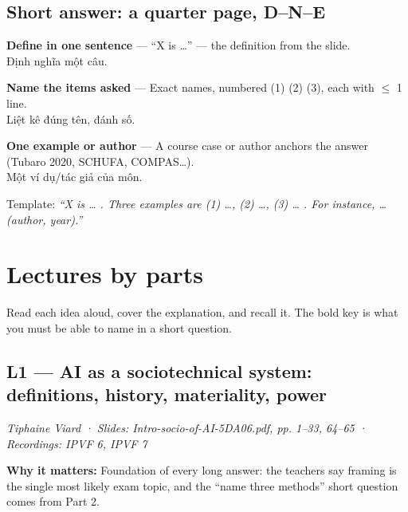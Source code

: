 \documentclass[11pt,a4paper]{article}
\newcommand{\vitext}[1]{{\small\color{tipc}#1}}
\newcommand{\blk}[1]{{\setlength{\fboxsep}{2pt}\colorbox{ink}{\sffamily\footnotesize\bfseries\color{white}\,#1\,}}}
\begin{document}
\subsection*{Short answer: a quarter page, D--N--E}\begin{description}[leftmargin=1.2cm,style=nextline]
\item[\blk{D}] \textbf{Define in one sentence} — “X is …” — the definition from the slide.\\\vitext{Định nghĩa một câu.}
\item[\blk{N}] \textbf{Name the items asked} — Exact names, numbered (1) (2) (3), each with $\leq$ 1 line.\\\vitext{Liệt kê đúng tên, đánh số.}
\item[\blk{E}] \textbf{One example or author} — A course case or author anchors the answer (Tubaro 2020, SCHUFA, COMPAS…).\\\vitext{Một ví dụ/tác giả của môn.}
\end{description}Template: \emph{“X is … . Three examples are (1) …, (2) …, (3) … . For instance, … (author, year).”}
\section{Lectures by parts}
Read each idea aloud, cover the explanation, and recall it. The bold key is what you must be able to name in a short question.
\subsection{L1 — AI as a sociotechnical system: definitions, history, materiality, power}
{\small\textit{Tiphaine Viard · Slides: Intro-socio-of-AI-5DA06.pdf, pp. 1–33, 64–65 · Recordings: IPVF 6, IPVF 7}}\par
\textbf{Why it matters:} Foundation of every long answer: the teachers say framing is the single most likely exam topic, and the “name three methods” short question comes from Part 2.
\end{document}
